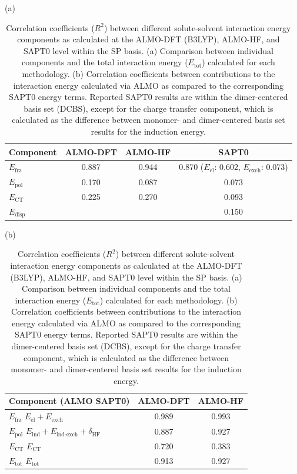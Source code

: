 \begin{table}
  \centering
  \caption[Correlation between ALMO and SAPT terms]{Correlation coefficients (\(R^2\)) between different solute-solvent interaction energy components as calculated at the ALMO-DFT (B3LYP), ALMO-HF, and SAPT0 level within the SP basis. (a) Comparison between individual components and the total interaction energy (\(E_{\text{tot}}\)) calculated for each methodology. (b) Correlation coefficients between contributions to the \cotil interaction energy calculated via ALMO as compared to the corresponding SAPT0 energy terms. Reported SAPT0 results are within the dimer-centered basis set (DCBS), except for the charge transfer component, which is calculated as the difference between monomer- and dimer-centered basis set results for the induction energy.}
  \label{paper_02:tab:7}

  (a)

  \begin{tabular}{lccc}
    \toprule
    Component & ALMO-DFT & ALMO-HF & SAPT0 \\
    \midrule
    \(E_{\text{frz}}\) & 0.887 & 0.944 & \makecell{0.870 \\ (\(E_{\text{el}}\): 0.602, \(E_{\text{exch}}\): 0.073)} \\
    \(E_{\text{pol}}\) & 0.170 & 0.087 & 0.073 \\
    \(E_{\text{CT}}\) & 0.225 & 0.270 & 0.093 \\
    \(E_{\text{disp}}\) & \textemdash{} & \textemdash{} & 0.150 \\
    \bottomrule
  \end{tabular}

  (b)

  \begin{tabular}{lcc}
    \toprule
    Component (ALMO \textemdash{} SAPT0) & ALMO-DFT & ALMO-HF \\
    \midrule
    \(E_{\text{frz}}\) \textemdash{} \(E_{\text{el}} + E_{\text{exch}}\) & 0.989 & 0.993 \\
    \(E_{\text{pol}}\) \textemdash{} \(E_{\text{ind}} + E_{\text{ind-exch}} + \delta_{\text{HF}}\) & 0.887 & 0.927 \\
    \(E_{\text{CT}}\) \textemdash{} \(E_{\text{CT}}\) & 0.720 & 0.383 \\
    \(E_{\text{tot}}\) \textemdash{} \(E_{\text{tot}}\) & 0.913 & 0.927 \\
    \bottomrule
  \end{tabular}
\end{table}

